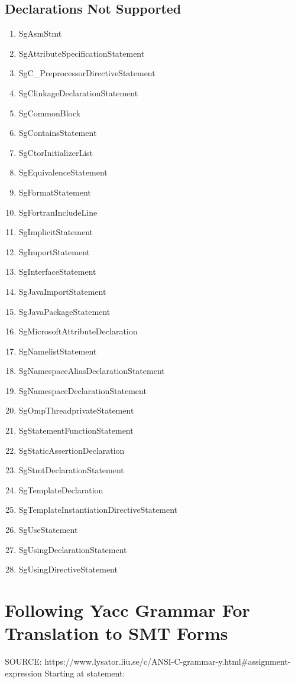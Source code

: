 \documentclass[11pt]{article}
\begin{document}
{\begin{enumeration}
\subsection{Declarations Not Supported}
\begin{enumerate}
\item SgAsmStmt
\item SgAttributeSpecificationStatement
\item SgC\_PreprocessorDirectiveStatement
\item SgClinkageDeclarationStatement
\item SgCommonBlock
\item SgContainsStatement
\item SgCtorInitializerList
\item SgEquivalenceStatement
\item SgFormatStatement
\item SgFortranIncludeLine
\item SgImplicitStatement
\item SgImportStatement
\item SgInterfaceStatement
\item SgJavaImportStatement
\item SgJavaPackageStatement
\item SgMicrosoftAttributeDeclaration
\item SgNamelistStatement
\item SgNamespaceAliasDeclarationStatement
\item SgNamespaceDeclarationStatement
\item SgOmpThreadprivateStatement
\item SgStatementFunctionStatement
\item SgStaticAssertionDeclaration
\item SgStmtDeclarationStatement
\item SgTemplateDeclaration
\item SgTemplateInstantiationDirectiveStatement 
\item SgUseStatement
\item SgUsingDeclarationStatement
\item SgUsingDirectiveStatement
\end{enumerate}

\section{Following Yacc Grammar For Translation to SMT Forms}
SOURCE: https://www.lysator.liu.se/c/ANSI-C-grammar-y.html#assignment-expression
Starting at statement:

\end{enumeration}}
\end{document}
